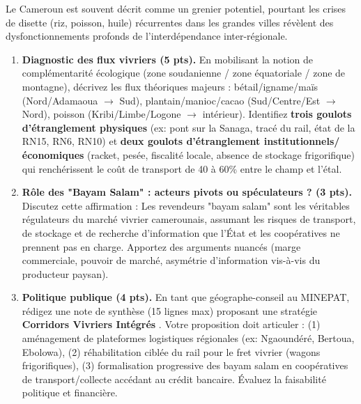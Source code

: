\documentclass[11pt]{article}
\begin{document}
\begin{exercice}
Le Cameroun est souvent décrit comme un \og grenier \fg potentiel, pourtant les crises de disette (riz, poisson, huile) récurrentes dans les grandes villes révèlent des dysfonctionnements profonds de l'interdépendance inter-régionale.

\begin{enumerate}
    \item \textbf{Diagnostic des flux vivriers (5 pts).} En mobilisant la notion de \og complémentarité écologique \fg (zone soudanienne / zone équatoriale / zone de montagne), décrivez les flux théoriques majeurs : bétail/igname/maïs (Nord/Adamaoua $\to$ Sud), plantain/manioc/cacao (Sud/Centre/Est $\to$ Nord), poisson (Kribi/Limbe/Logone $\to$ intérieur). Identifiez \textbf{trois goulots d'étranglement physiques} (ex: pont sur la Sanaga, tracé du rail, état de la RN15, RN6, RN10) et \textbf{deux goulots d'étranglement institutionnels/économiques} (racket, pesée, fiscalité locale, absence de stockage frigorifique) qui renchérissent le coût de transport de 40 à 60\% entre le champ et l'étal.
    \item \textbf{Rôle des "Bayam Salam" : acteurs pivots ou spéculateurs ? (3 pts).} Discutez cette affirmation : \og Les revendeurs "bayam salam" sont les véritables régulateurs du marché vivrier camerounais, assumant les risques de transport, de stockage et de recherche d'information que l'État et les coopératives ne prennent pas en charge. \fg Apportez des arguments nuancés (marge commerciale, pouvoir de marché, asymétrie d'information vis-à-vis du producteur paysan).
    \item \textbf{Politique publique (4 pts).} En tant que géographe-conseil au MINEPAT, rédigez une note de synthèse (15 lignes max) proposant une stratégie \og \textbf{Corridors Vivriers Intégrés} \fg. Votre proposition doit articuler : (1) aménagement de plateformes logistiques régionales (ex: Ngaoundéré, Bertoua, Ebolowa), (2) réhabilitation ciblée du rail pour le fret vivrier (wagons frigorifiques), (3) formalisation progressive des \og bayam salam \fg en coopératives de transport/collecte accédant au crédit bancaire. Évaluez la faisabilité politique et financière.
\end{enumerate}
\end{exercice}
\end{document}
